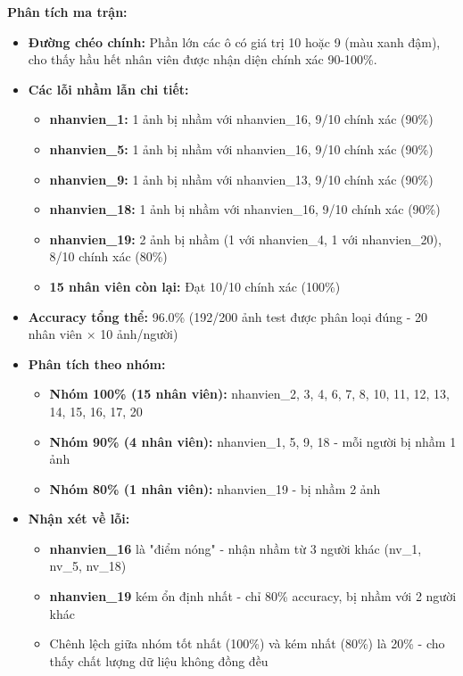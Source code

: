 \documentclass[a4paper]{book}
\begin{document}
\textbf{Phân tích ma trận:}
\begin{itemize}
    \item \textbf{Đường chéo chính:} Phần lớn các ô có giá trị 10 hoặc 9 (màu xanh đậm), cho thấy hầu hết nhân viên được nhận diện chính xác 90-100\%.
    
    \item \textbf{Các lỗi nhầm lẫn chi tiết:}
    \begin{itemize}
        \item \textbf{nhanvien\_1:} 1 ảnh bị nhầm với nhanvien\_16, 9/10 chính xác (90\%)
        \item \textbf{nhanvien\_5:} 1 ảnh bị nhầm với nhanvien\_16, 9/10 chính xác (90\%)
        \item \textbf{nhanvien\_9:} 1 ảnh bị nhầm với nhanvien\_13, 9/10 chính xác (90\%)
        \item \textbf{nhanvien\_18:} 1 ảnh bị nhầm với nhanvien\_16, 9/10 chính xác (90\%)
        \item \textbf{nhanvien\_19:} 2 ảnh bị nhầm (1 với nhanvien\_4, 1 với nhanvien\_20), 8/10 chính xác (80\%)
        \item \textbf{15 nhân viên còn lại:} Đạt 10/10 chính xác (100\%)
    \end{itemize}
    
    \item \textbf{Accuracy tổng thể:} 96.0\% (192/200 ảnh test được phân loại đúng - 20 nhân viên × 10 ảnh/người)
    
    \item \textbf{Phân tích theo nhóm:}
    \begin{itemize}
        \item \textbf{Nhóm 100\% (15 nhân viên):} nhanvien\_2, 3, 4, 6, 7, 8, 10, 11, 12, 13, 14, 15, 16, 17, 20
        \item \textbf{Nhóm 90\% (4 nhân viên):} nhanvien\_1, 5, 9, 18 - mỗi người bị nhầm 1 ảnh
        \item \textbf{Nhóm 80\% (1 nhân viên):} nhanvien\_19 - bị nhầm 2 ảnh
    \end{itemize}
    
    \item \textbf{Nhận xét về lỗi:}
    \begin{itemize}
        \item \textbf{nhanvien\_16} là "điểm nóng" - nhận nhầm từ 3 người khác (nv\_1, nv\_5, nv\_18)
        \item \textbf{nhanvien\_19} kém ổn định nhất - chỉ 80\% accuracy, bị nhầm với 2 người khác
        \item Chênh lệch giữa nhóm tốt nhất (100\%) và kém nhất (80\%) là 20\% - cho thấy chất lượng dữ liệu không đồng đều
    \end{itemize}
    

\end{itemize}
\end{document}
